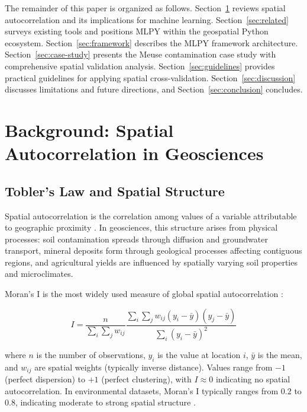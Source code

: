 \documentclass[a4paper,fleqn]{cas-sc}
\begin{document}
The remainder of this paper is organized as follows. Section~\ref{sec:background} reviews spatial autocorrelation and its implications for machine learning. Section~\ref{sec:related} surveys existing tools and positions MLPY within the geospatial Python ecosystem. Section~\ref{sec:framework} describes the MLPY framework architecture. Section~\ref{sec:case-study} presents the Meuse contamination case study with comprehensive spatial validation analysis. Section~\ref{sec:guidelines} provides practical guidelines for applying spatial cross-validation. Section~\ref{sec:discussion} discusses limitations and future directions, and Section~\ref{sec:conclusion} concludes.


\section{Background: Spatial Autocorrelation in Geosciences}
\label{sec:background}

\subsection{Tobler's Law and Spatial Structure}

Spatial autocorrelation is the correlation among values of a variable attributable to geographic proximity \citep{legendre1993spatial}. In geosciences, this structure arises from physical processes: soil contamination spreads through diffusion and groundwater transport, mineral deposits form through geological processes affecting contiguous regions, and agricultural yields are influenced by spatially varying soil properties and microclimates.

Moran's I is the most widely used measure of global spatial autocorrelation \citep{moran1950notes}:

\begin{equation}
I = \frac{n}{\sum_{i}\sum_{j} w_{ij}} \frac{\sum_{i}\sum_{j} w_{ij}(y_i - \bar{y})(y_j - \bar{y})}{\sum_{i}(y_i - \bar{y})^2}
\end{equation}

where $n$ is the number of observations, $y_i$ is the value at location $i$, $\bar{y}$ is the mean, and $w_{ij}$ are spatial weights (typically inverse distance). Values range from $-1$ (perfect dispersion) to $+1$ (perfect clustering), with $I \approx 0$ indicating no spatial autocorrelation. In environmental datasets, Moran's I typically ranges from 0.2 to 0.8, indicating moderate to strong spatial structure \citep{goovaerts1997geostatistics}.
\end{document}
